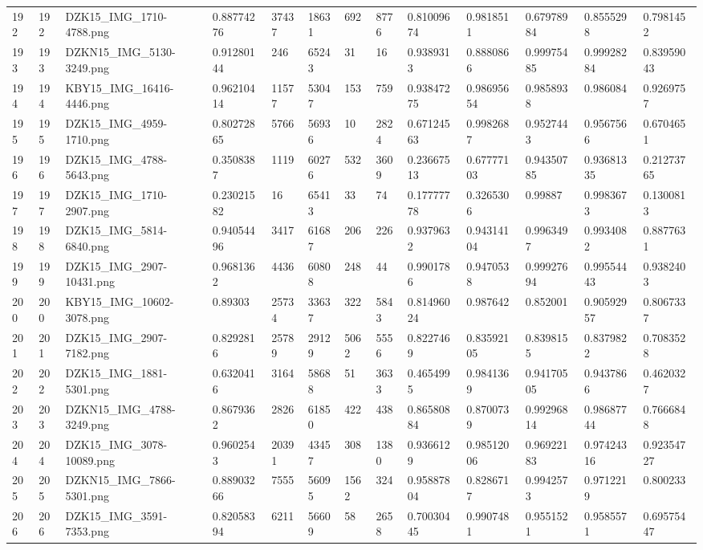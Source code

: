 \documentclass[11pt, a4paper, twoside]{report}
\begin{document}
\begin{longtable}[c]{@{}lllllllllllll@{}}
192 & 192 & DZK15\_IMG\_1710-4788.png & 0.88774276 & 37437 & 18631 & 692 & 8776 & 0.81009674 & 0.9818511 & 0.67978984 & 0.8555298 & 0.7981452 \\
193 & 193 & DZKN15\_IMG\_5130-3249.png & 0.91280144 & 246 & 65243 & 31 & 16 & 0.9389313 & 0.8880866 & 0.99975485 & 0.99928284 & 0.83959043 \\
194 & 194 & KBY15\_IMG\_16416-4446.png & 0.96210414 & 11577 & 53047 & 153 & 759 & 0.93847275 & 0.98695654 & 0.9858938 & 0.986084 & 0.9269757 \\
195 & 195 & DZK15\_IMG\_4959-1710.png & 0.80272865 & 5766 & 56936 & 10 & 2824 & 0.67124563 & 0.9982687 & 0.9527443 & 0.9567566 & 0.6704651 \\
196 & 196 & DZK15\_IMG\_4788-5643.png & 0.3508387 & 1119 & 60276 & 532 & 3609 & 0.23667513 & 0.67777103 & 0.94350785 & 0.93681335 & 0.21273765 \\
197 & 197 & DZK15\_IMG\_1710-2907.png & 0.23021582 & 16 & 65413 & 33 & 74 & 0.17777778 & 0.3265306 & 0.99887 & 0.9983673 & 0.1300813 \\
198 & 198 & DZK15\_IMG\_5814-6840.png & 0.94054496 & 3417 & 61687 & 206 & 226 & 0.9379632 & 0.94314104 & 0.9963497 & 0.9934082 & 0.8877631 \\
199 & 199 & DZK15\_IMG\_2907-10431.png & 0.9681362 & 4436 & 60808 & 248 & 44 & 0.9901786 & 0.9470538 & 0.99927694 & 0.99554443 & 0.9382403 \\
200 & 200 & KBY15\_IMG\_10602-3078.png & 0.89303 & 25734 & 33637 & 322 & 5843 & 0.81496024 & 0.987642 & 0.852001 & 0.90592957 & 0.8067337 \\
201 & 201 & DZK15\_IMG\_2907-7182.png & 0.8292816 & 25789 & 29129 & 5062 & 5556 & 0.8227469 & 0.83592105 & 0.8398155 & 0.8379822 & 0.7083528 \\
202 & 202 & DZK15\_IMG\_1881-5301.png & 0.6320416 & 3164 & 58688 & 51 & 3633 & 0.4654995 & 0.9841369 & 0.94170505 & 0.9437866 & 0.4620327 \\
203 & 203 & DZKN15\_IMG\_4788-3249.png & 0.8679362 & 2826 & 61850 & 422 & 438 & 0.86580884 & 0.8700739 & 0.99296814 & 0.98687744 & 0.7666848 \\
204 & 204 & DZK15\_IMG\_3078-10089.png & 0.9602543 & 20391 & 43457 & 308 & 1380 & 0.9366129 & 0.98512006 & 0.96922183 & 0.97424316 & 0.92354727 \\
205 & 205 & DZKN15\_IMG\_7866-5301.png & 0.88903266 & 7555 & 56095 & 1562 & 324 & 0.95887804 & 0.8286717 & 0.9942573 & 0.9712219 & 0.800233 \\
206 & 206 & DZK15\_IMG\_3591-7353.png & 0.82058394 & 6211 & 56609 & 58 & 2658 & 0.70030445 & 0.9907481 & 0.9551521 & 0.9585571 & 0.69575447 \\

\end{longtable}
\end{document}
